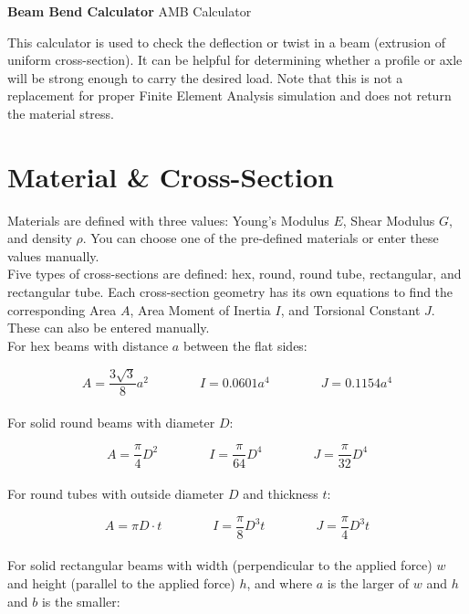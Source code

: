 \documentclass[a4paper]{article}
\begin{document}
	
	\Huge\textbf{Beam Bend Calculator}
	\newline
	\LARGE AMB Calculator
	
	\vspace{0.5cm}
	\normalsize
	
	This calculator is used to check the deflection or twist in a beam (extrusion of uniform cross-section). It can be helpful for determining whether a profile or axle will be strong enough to carry the desired load. Note that this is not a replacement for proper Finite Element Analysis simulation and does not return the material stress.
	
	\section*{Material \& Cross-Section}
	
	Materials are defined with three values: Young's Modulus $ E $, Shear Modulus $ G $, and density $ \rho $. You can choose one of the pre-defined materials or enter these values manually.\\
	
	Five types of cross-sections are defined: hex, round, round tube, rectangular, and rectangular tube. Each cross-section geometry has its own equations to find the corresponding Area $ A $, Area Moment of Inertia $ I $, and Torsional Constant $ J $. These can also be entered manually.\\
	
	For hex beams with distance $ a $ between the flat sides:
	
	\begin{equation}
		A = \frac{3 \sqrt{3}}{8} a^2 \qquad\qquad
		I = 0.0601 a^4 \qquad\qquad
		J = 0.1154 a^4
	\end{equation}
	\\
	For solid round beams with diameter $ D $:
	
	\begin{equation}
		A = \frac{\pi}{4} D^2 \qquad\qquad
		I = \frac{\pi}{64} D^4 \qquad\qquad
		J = \frac{\pi}{32} D^4
	\end{equation}
	\\
	For round tubes with outside diameter $ D $ and thickness $ t $:
	
	\begin{equation}
		A = \pi D \cdot t \qquad\qquad
		I = \frac{\pi}{8} D^3 t \qquad\qquad
		J = \frac{\pi}{4} D^3 t
	\end{equation}
	\\
	For solid rectangular beams with width (perpendicular to the applied force) $ w $ and height (parallel to the applied force) $ h $, and where $ a $ is the larger of $ w $ and $ h $ and $ b $ is the smaller:
	
\end{document}
